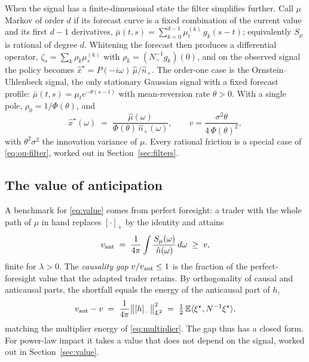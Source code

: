 \documentclass[11pt]{article}
\newcommand{\E}{\mathbb{E}}
\newcommand{\pluspart}[1]{\left[#1\right]_+}
\newcommand{\minuspart}[1]{\left[#1\right]_-}
\theoremstyle{plain}
\theoremstyle{definition}
\theoremstyle{remark}
\begin{document}
When the signal has a finite-dimensional state the filter simplifies further. Call $\mu$ Markov of order $d$ if its forecast curve is a fixed combination of the current value and its first $d-1$ derivatives, $\bar\mu(t,s)=\sum_{k=0}^{d-1}\mu^{(k)}_t\,g_k(s-t)$; equivalently $S_\mu$ is rational of degree $d$. Whitening the forecast then produces a differential operator, $\zeta_s=\sum_k\rho_k\mu^{(k)}_s$ with $\rho_k=(N_-^{-1}g_k)(0)$, and on the observed signal the policy becomes $\hat x^\star=P(-i\omega)\,\hat\mu/\hat n_+$. The order-one case is the Ornstein--Uhlenbeck signal, the only stationary Gaussian signal with a fixed forecast profile: $\bar\mu(t,s)=\mu_t e^{-\theta(s-t)}$ with mean-reversion rate $\theta>0$. With a single pole, $\rho_0=1/\Phi(\theta)$, and
\begin{equation}\label{eq:ou-filter}
\hat x^\star(\omega) \;=\; \frac{\hat\mu(\omega)}{\Phi(\theta)\,\hat n_+(\omega)},
\qquad v = \frac{\sigma^2\theta}{4\,\Phi(\theta)^2},
\end{equation}
with $\theta^2\sigma^2$ the innovation variance of $\mu$. Every rational friction is a special case of \eqref{eq:ou-filter}, worked out in Section~\ref{sec:filters}.

\subsection{The value of anticipation}\label{sec:value-general}

A benchmark for \eqref{eq:value} comes from perfect foresight: a trader with the whole path of $\mu$ in hand replaces $\pluspart{\cdot}$ by the identity and attains
\begin{equation}\label{eq:vant}
v_{\rm ant} \;=\; \frac{1}{4\pi}\int\frac{S_\mu(\omega)}{\hat n(\omega)}\,d\omega \;\ge\; v ,
\end{equation}
finite for $\lambda>0$. The \emph{causality gap} $v/v_{\rm ant}\le1$ is the fraction of the perfect-foresight value that the adapted trader retains. By orthogonality of causal and anticausal parts, the shortfall equals the energy of the anticausal part of $h$,
\[
v_{\rm ant}-v \;=\; \frac{1}{4\pi}\bigl\|\minuspart{h}\bigr\|_{L^2}^2 \;=\; \tfrac12\,\E\langle\xi^\star,N^{-1}\xi^\star\rangle ,
\]
matching the multiplier energy of \eqref{eq:multiplier}. The gap thus has a closed form. For power-law impact it takes a value that does not depend on the signal, worked out in Section~\ref{sec:value}.

\end{document}

